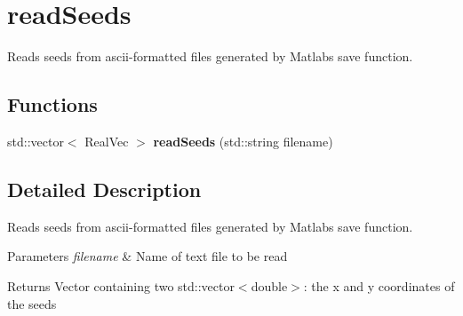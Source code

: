 \hypertarget{group__readSeeds}{}\section{read\+Seeds}
\label{group__readSeeds}


Reads seeds from ascii-\/formatted files generated by Matlab\textquotesingle{}s \textquotesingle{}save\textquotesingle{} function.  


\subsection*{Functions}
\begin{DoxyCompactItemize}
\item 
\mbox{\label{group__readSeeds_gad85b04f26adf16a2034600271b5cbcb3}} 
std\+::vector$<$ Real\+Vec $>$ {\bfseries read\+Seeds} (std\+::string filename)
\end{DoxyCompactItemize}


\subsection{Detailed Description}
Reads seeds from ascii-\/formatted files generated by Matlab\textquotesingle{}s \textquotesingle{}save\textquotesingle{} function. 


\begin{DoxyParams}{Parameters}
{\em filename} & Name of text file to be read \\
\hline
\end{DoxyParams}
\begin{DoxyReturn}{Returns}
Vector containing two std\+::vector$<$double$>$\+: the x and y coordinates of the seeds 
\end{DoxyReturn}
